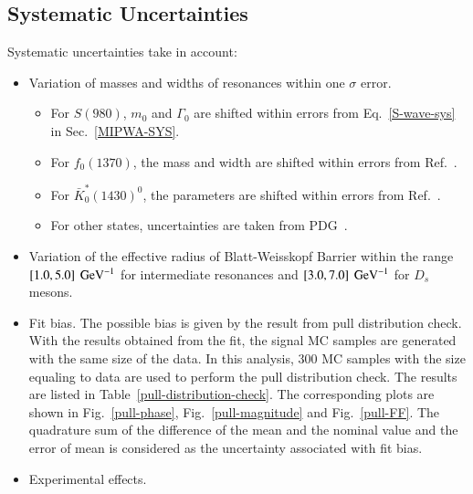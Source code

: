 \subsection{Systematic Uncertainties}
\label{PWA-Sys}
\par{
    Systematic uncertainties take in account:
    \begin{itemize}
        \item \uppercase\expandafter{} Variation of masses and widths of resonances within one $\sigma$ error.
            \begin{itemize}
                \item For $S(980)$, $m_{0}$ and $\Gamma_{0}$ are shifted within errors from Eq.~\ref{S-wave-sys} in Sec.~\ref{MIPWA-SYS}.
                \item For $f_{0}(1370)$, the mass and width are shifted within errors from Ref.~\cite{para-f01370}.
                \item For $\bar{K}^{*}_{0}(1430)^{0}$, the parameters are shifted within errors from Ref.~\cite{2011BARBAR}.
                \item For other states, uncertainties are taken from PDG~\cite{PDG2018}.
            \end{itemize}
        \item \uppercase\expandafter{} Variation of the effective radius of Blatt-Weisskopf Barrier within the range $\left[1.0, 5.0\right] \ {\rm GeV}^{-1}$ for intermediate resonances and  $\left[3.0, 7.0\right] \ {\rm GeV}^{-1}$ for $D_{s}$ mesons. 
        \item \uppercase\expandafter{} Fit bias. The possible bias is given by the result from pull distribution check. 
            With the results obtained from the fit, the signal MC samples are generated with the same size of the data. In this analysis, 300 MC samples with the size equaling to data are used to perform the pull distribution check.
            The results are listed in Table~\ref{pull-distribution-check}.
            The corresponding plots are shown in Fig.~\ref{pull-phase}, Fig.~\ref{pull-magnitude} and Fig.~\ref{pull-FF}.
            The quadrature sum of the difference of the mean and the nominal value and the error of mean is considered as the uncertainty associated with fit bias.
        \item \uppercase\expandafter{} Experimental effects. 

\end{itemize}}
